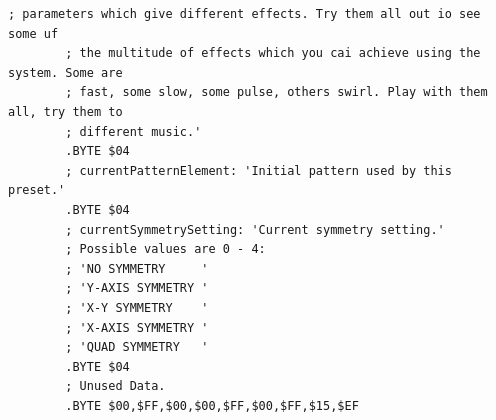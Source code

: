 \begin{lstlisting}[basicstyle=\tiny,caption=Source code for Preset 15.]
        ; parameters which give different effects. Try them all out io see some uf
        ; the multitude of effects which you cai achieve using the system. Some are
        ; fast, some slow, some pulse, others swirl. Play with them all, try them to
        ; different music.'
        .BYTE $04
        ; currentPatternElement: 'Initial pattern used by this preset.'
        .BYTE $04
        ; currentSymmetrySetting: 'Current symmetry setting.'
        ; Possible values are 0 - 4:
        ; 'NO SYMMETRY     '
        ; 'Y-AXIS SYMMETRY '
        ; 'X-Y SYMMETRY    '
        ; 'X-AXIS SYMMETRY '
        ; 'QUAD SYMMETRY   '
        .BYTE $04
        ; Unused Data.
        .BYTE $00,$FF,$00,$00,$FF,$00,$FF,$15,$EF
\end{lstlisting}

